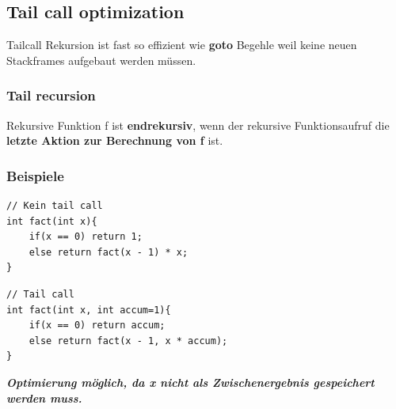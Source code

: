 \subsection{Tail call optimization}
Tailcall Rekursion ist fast so effizient wie \textbf{goto} Begehle weil keine neuen
Stackframes aufgebaut werden müssen.

\subsubsection{Tail recursion}
Rekursive Funktion f ist \textbf{endrekursiv}, wenn der rekursive Funktionsaufruf die \textbf{letzte Aktion zur Berechnung von f} ist.

\subsubsection{Beispiele}
\lstset{language=C,style=customstyle}
\begin{lstlisting}
// Kein tail call
int fact(int x){
    if(x == 0) return 1;
    else return fact(x - 1) * x;
}
\end{lstlisting}


\lstset{language=C,style=customstyle}
\begin{lstlisting}
// Tail call
int fact(int x, int accum=1){
    if(x == 0) return accum;
    else return fact(x - 1, x * accum);
}
\end{lstlisting}
\textbf{\textit{Optimierung möglich, da x nicht als Zwischenergebnis gespeichert werden muss.}}
